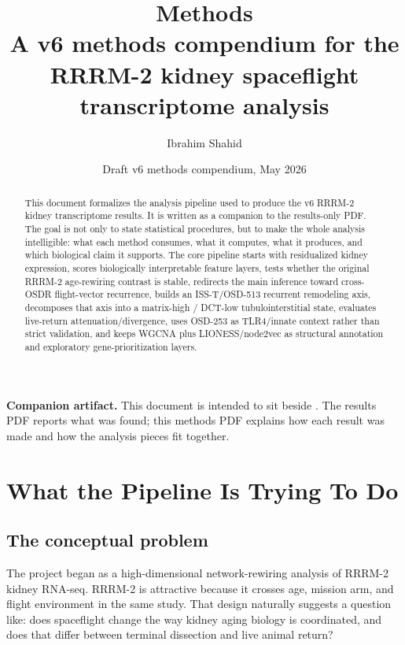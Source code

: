 \documentclass[11pt]{article}
\title{\textbf{Methods}\\[0.35em]
\large A v6 methods compendium for the RRRM-2 kidney spaceflight transcriptome analysis}
\author{Ibrahim Shahid}
\affil{Independent research draft for mentor feedback\\Authorship/collaboration structure pending}
\date{Draft v6 methods compendium, May 2026}
\begin{document}
\maketitle

\begin{abstract}
\noindent
This document formalizes the analysis pipeline used to produce the v6 RRRM-2 kidney transcriptome results. It is written as a companion to the results-only PDF. The goal is not only to state statistical procedures, but to make the whole analysis intelligible: what each method consumes, what it computes, what it produces, and which biological claim it supports. The core pipeline starts with residualized kidney expression, scores biologically interpretable feature layers, tests whether the original RRRM-2 age-rewiring contrast is stable, redirects the main inference toward cross-OSDR flight-vector recurrence, builds an ISS-T/OSD-513 recurrent remodeling axis, decomposes that axis into a matrix-high / DCT-low tubulointerstitial state, evaluates live-return attenuation/divergence, uses OSD-253 as TLR4/innate context rather than strict validation, and keeps WGCNA plus LIONESS/node2vec as structural annotation and exploratory gene-prioritization layers.
\end{abstract}

\vspace{0.5em}
\noindent\textbf{Companion artifact.} This document is intended to sit beside . The results PDF reports what was found; this methods PDF explains how each result was made and how the analysis pieces fit together.

\clearpage
\tableofcontents
\clearpage

\section{What the Pipeline Is Trying To Do}

\subsection{The conceptual problem}

The project began as a high-dimensional network-rewiring analysis of RRRM-2 kidney RNA-seq. RRRM-2 is attractive because it crosses age, mission arm, and flight environment in the same study. That design naturally suggests a question like: does spaceflight change the way kidney aging biology is coordinated, and does that differ between terminal dissection and live animal return?
\end{document}
